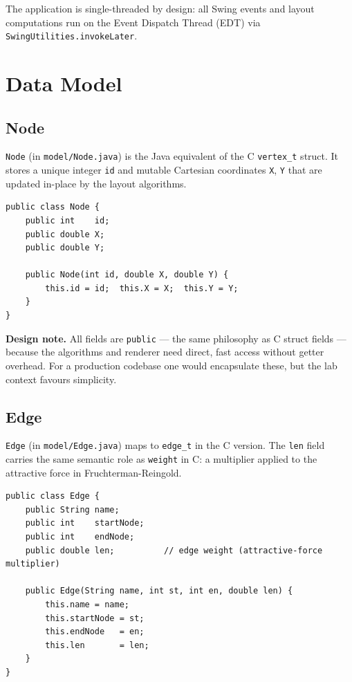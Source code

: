 \documentclass[12pt,a4paper]{article}
\begin{document}
\medskip
The application is single-threaded by design: all Swing events and
layout computations run on the Event Dispatch Thread (EDT) via
\texttt{SwingUtilities.invokeLater}.

\section{Data Model}

\subsection{Node}

\texttt{Node} (in \texttt{model/Node.java}) is the Java equivalent of the
C \texttt{vertex\_t} struct. It stores a unique integer \texttt{id} and
mutable Cartesian coordinates \texttt{X}, \texttt{Y} that are updated
in-place by the layout algorithms.

\begin{lstlisting}[caption={Node class}]
public class Node {
    public int    id;
    public double X;
    public double Y;

    public Node(int id, double X, double Y) {
        this.id = id;  this.X = X;  this.Y = Y;
    }
}
\end{lstlisting}

\textbf{Design note.} All fields are \texttt{public} — the same philosophy
as C struct fields — because the algorithms and renderer need direct, fast
access without getter overhead. For a production codebase one would
encapsulate these, but the lab context favours simplicity.

\subsection{Edge}

\texttt{Edge} (in \texttt{model/Edge.java}) maps to \texttt{edge\_t} in the
C version. The \texttt{len} field carries the same semantic role as
\texttt{weight} in C: a multiplier applied to the attractive force in
Fruchterman-Reingold.

\begin{lstlisting}[caption={Edge class}]
public class Edge {
    public String name;
    public int    startNode;
    public int    endNode;
    public double len;          // edge weight (attractive-force multiplier)

    public Edge(String name, int st, int en, double len) {
        this.name = name;
        this.startNode = st;
        this.endNode   = en;
        this.len       = len;
    }
}
\end{lstlisting}
\end{document}
